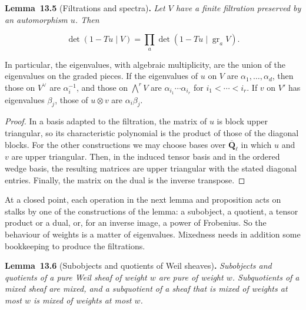 \documentclass[11pt]{article}
\newenvironment{bpstatement}[2]{\par\addvspace{0.6\baselineskip}\noindent\textbf{#1}#2\textbf{.}\enspace\ignorespaces}
  {\par\addvspace{0.4\baselineskip}}
\newenvironment{bpstatementit}[2]{\begin{bpstatement}{#1}{#2}\itshape\ignorespaces}{\end{bpstatement}}
\begin{document}
\label{bp17}%
\begin{bpstatementit}{Lemma~13.5}{ (Filtrations and spectra)}
Let \(V\) have a finite filtration preserved by an automorphism \(u\). Then

\[
\det(1-Tu\mid V)=\prod_a\det(1-Tu\mid\operatorname{gr}_aV).
\]

In particular, the eigenvalues, with algebraic multiplicity, are the union of the eigenvalues on the graded pieces. If the eigenvalues of \(u\) on \(V\) are \(\alpha_1,\ldots,\alpha_d\), then those on \(V^\vee\) are \(\alpha_i^{-1}\), and those on \(\bigwedge^rV\) are \(\alpha_{i_1}\cdots\alpha_{i_r}\) for \(i_1<\cdots<i_r\). If \(v\) on \(V'\) has eigenvalues \(\beta_j\), those of \(u\otimes v\) are \(\alpha_i\beta_j\).
\end{bpstatementit}

\begin{proof}[{Proof}]\label{bp18}%
In a basis adapted to the filtration, the matrix of \(u\) is block upper triangular, so its characteristic polynomial is the product of those of the diagonal blocks. For the other constructions we may choose bases over \(\overline{\mathbf Q}_\ell\) in which \(u\) and \(v\) are upper triangular. Then, in the induced tensor basis and in the ordered wedge basis, the resulting matrices are upper triangular with the stated diagonal entries. Finally, the matrix on the dual is the inverse transpose.
\end{proof}

\label{bp19}%
At a closed point, each operation in the next lemma and proposition acts on stalks by one of the constructions of the lemma: a subobject, a quotient, a tensor product or a dual, or, for an inverse image, a power of Frobenius. So the behaviour of weights is a matter of eigenvalues. Mixedness needs in addition some bookkeeping to produce the filtrations.

\label{bp20}%
\begin{bpstatementit}{Lemma~13.6}{ (Subobjects and quotients of Weil sheaves)}
Subobjects and quotients of a pure Weil sheaf of weight \(w\) are pure of weight \(w\). Subquotients of a mixed sheaf are mixed, and a subquotient of a sheaf that is mixed of weights at most \(w\) is mixed of weights at most \(w\).
\end{bpstatementit}
\end{document}
